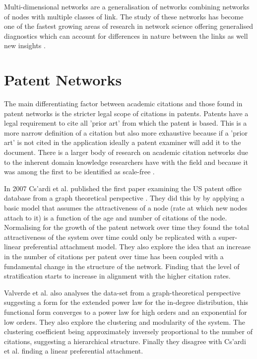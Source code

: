 Multi-dimensional networks are a generalisation of networks combining networks of nodes with multiple classes of link. The study of these networks has become one of the fastest growing areas of research in network science offering generalised diagnostics which can account for differences in nature between the links as well new insights \cite{hardtoSpell}.

\section{Patent Networks}

The main differentiating factor between academic citations and those found in patent networks is the stricter legal scope of citations in patents. Patents have a legal requirement to cite all 'prior art' from which the patent is based. This is a more narrow definition of a citation but also more exhaustive because if a 'prior art' is not cited in the application ideally a patent examiner will add it to the document. There is a larger body of research on academic citation networks due to the inherent domain knowledge researchers have with the field and because it was among the first to be identified as scale-free \cite{albert2002statistical}.

In 2007 Cs'ardi et al. published the first paper examining the US patent office database from a graph theoretical perspective \cite{csardi2007modeling}. They did this by by applying a basic model that assumes the attractiveness of a node (rate at which new nodes attach to it) is a function of the age and number of citations of the node. Normalising for the growth of the patent network over time they found the total attractiveness of the system over time could only be replicated with a super-linear preferential attachment model. They also explore the idea that an increase in the number of citations per patent over time has been coupled with a fundamental change in the structure of the network. Finding that the level of stratification starts to increase in alignment with the higher citation rates. 

Valverde et al. \cite{valverde2007topology} also analyses the data-set from a graph-theoretical perspective suggesting a form for the extended power law for the in-degree distribution, this functional form converges to a power law for high orders and an exponential for low orders. They also explore the clustering and modularity of the system. The clustering coefficient being approximately inversely proportional to the number of citations, suggesting a hierarchical structure. Finally they disagree with Cs'ardi et al. finding a linear preferential attachment. 

